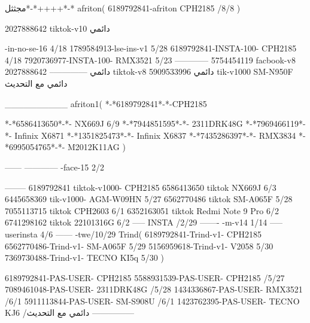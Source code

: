 مجثثل*-*++++*-*
afriton(
6189792841-afriton CPH2185  /8/8
)

2027888642 tiktok-v10
دائمي

-in-no-se-16 4/18
1789584913-lse-ins-v1 5/28
6189792841-INSTA-100- CPH2185 4/18
7920736977-INSTA-100- RMX3521 5/23
------------
5754454119 facbook-v8
دائمي
--------------
2027888642 tiktok-v8
دائمي
5909533996 tik-v1000  SM-N950F
دائمي مع التحديث

__________
afriton1(
*-*6189792841*-*-CPH2185

*-*6586413650*-*- NX669J  6/9
*-*7944851595*-*-   2311DRK48G  \5
*-*7969466119*-*-   Infinix X6871  \5
*-*1351825473*-*-   Infinix X6837  \5
*-*7435286397*-*-   RMX3834  \5
*-*6995054765*-*-   M2012K11AG  \5
)


------
------------
-face-15 2/2

--------
6189792841 tiktok-v1000- CPH2185 
6586413650 tiktok NX669J  6/3
6445658369 tik-v1000- AGM-W09HN  5/27
6562770486 tiktok  SM-A065F   5/28
7055113715 tiktok  CPH2603   6/1
6352163051 tiktok  Redmi Note 9 Pro   6/2
6741298162 tiktok 22101316G  6/2
-----
 INSTA /2/29
-------
-m-v14 1/14
-----
userinsta 4/6
------
-twe/10/29
Trind(
6189792841-Trind-v1- CPH2185 
6562770486-Trind-v1- SM-A065F   5/29
5156959618-Trind-v1- V2058   5/30
7369730488-Trind-v1- TECNO KI5q   5/30
)


6189792841-PAS-USER- CPH2185 
5588931539-PAS-USER-  CPH2185  /5/27
7089461048-PAS-USER-  2311DRK48G  /5/28
1434336867-PAS-USER-  RMX3521  /6/1
5911113844-PAS-USER-  SM-S908U  /6/1
1423762395-PAS-USER- TECNO KJ6  /دائمي مع التحديث
    ---------------
